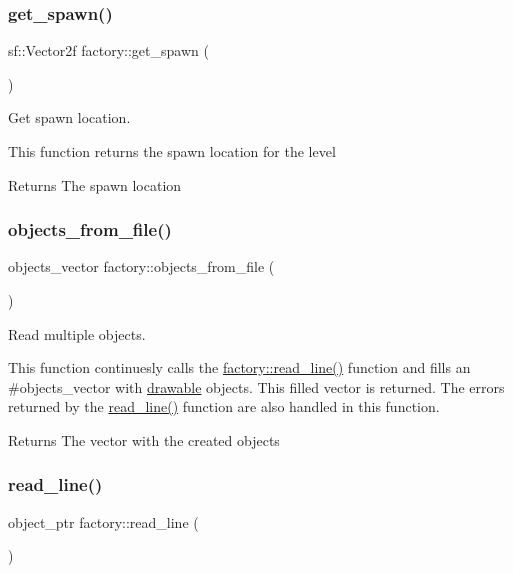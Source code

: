 \subsubsection{\texorpdfstring{get\+\_\+spawn()}{get\_spawn()}}
{\footnotesize\ttfamily sf\+::\+Vector2f factory\+::get\+\_\+spawn (\begin{DoxyParamCaption}{ }\end{DoxyParamCaption})}



Get spawn location. 

This function returns the spawn location for the level

\begin{DoxyReturn}{Returns}
The spawn location 
\end{DoxyReturn}
\mbox{\label{classfactory_afb2fad4ac9b0f39b1bfc3f3fc8d218b6}} 
\subsubsection{\texorpdfstring{objects\+\_\+from\+\_\+file()}{objects\_from\_file()}}
{\footnotesize\ttfamily objects\+\_\+vector factory\+::objects\+\_\+from\+\_\+file (\begin{DoxyParamCaption}{ }\end{DoxyParamCaption})}



Read multiple objects. 

This function continuesly calls the \hyperlink{classfactory_a82385866bc910c1b3a3e82d56487dd24}{factory\+::read\+\_\+line()} function and fills an \#objects\+\_\+vector with \hyperlink{classdrawable}{drawable} objects. This filled vector is returned. The errors returned by the \hyperlink{classfactory_a82385866bc910c1b3a3e82d56487dd24}{read\+\_\+line()} function are also handled in this function. \begin{DoxyReturn}{Returns}
The vector with the created objects 
\end{DoxyReturn}
\mbox{\label{classfactory_a82385866bc910c1b3a3e82d56487dd24}} 
\subsubsection{\texorpdfstring{read\+\_\+line()}{read\_line()}}
{\footnotesize\ttfamily object\+\_\+ptr factory\+::read\+\_\+line (\begin{DoxyParamCaption}{ }\end{DoxyParamCaption})}



